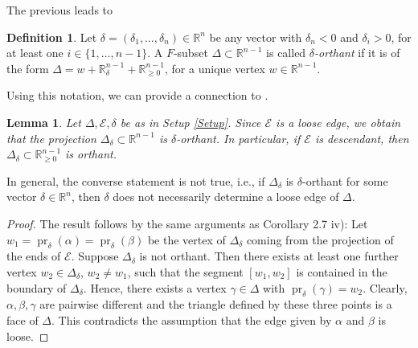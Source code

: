 \documentclass[11pt]{amsart}
\theoremstyle{plain}
\newtheorem{Lem}[Thm]{Lemma}
\theoremstyle{definition}
\newtheorem{Def}[Thm]{Definition}
\numberwithin{equation}{section}
\newcommand{\pr}{\operatorname{pr}}
\renewcommand{\a}{\alpha}
\renewcommand{\b}{\beta}
\newcommand{\g}{\gamma}
\renewcommand{\d}{\delta}
\newcommand{\D}{\Delta}
\newcommand{\RR}{\mathbb R}
\newcommand{\cE}{\mathcal{E}}
\newcommand{\gqz}{{\geq 0}}
\renewcommand{\(}{(\!(}
\renewcommand{\)}{)\!)}
\begin{document}
The previous leads to

\begin{Def}
	Let $ \d = (\d_1, \ldots , \d_n )\in \RR^{n} $ be {any} vector with $ \d_n < 0 $ and $ \d_i > 0 $, for at least one $ i \in \{ 1, \ldots, n- 1 \} $. 
	A $ F $-subset $ \D \subset \RR^{n-1} $ is called {\em $ \d $-orthant}
	if it is of the form
	$ \D = w + \RR^{n-1}_\d + \RR^{n-1}_\gqz $,
	for a unique vertex $ w \in \RR^{n-1} $.
\end{Def}

Using this notation, we can provide a connection to \cite{RS}.

\begin{Lem}
	\label{Lem:loose=>orthant}
	Let $ \D, \cE, \d $ be as in Setup \ref{Setup}.
	Since $ \cE $ is a loose edge, we obtain that the projection $ \D_\d  \subset \RR^{n-1} $ is $ \d $-orthant.
	In particular, if $ \cE $ is descendant, then $ \D_\d \subset \RR^{n-1}_\gqz $ is orthant.
\end{Lem}



In general, the converse statement is not true,
i.e., if $ \D_\d $ is $ \d $-orthant for some vector $ \d \in \RR^n$, 
then $ \d $ does not necessarily determine a loose edge of $ \D $.


\begin{proof}
	The result follows by the same arguments as \cite{RS} Corollary 2.7 iv):
	Let $ w_1 = \pr_\d (\a) = \pr_\d (\b) $ be the vertex of $  \D_\d $ coming from the projection of the ends of $ \cE $. 
	Suppose $ \D_\d $ is not orthant.
	Then there exists at least one further vertex $ w_2 \in \D_\d $, $ w_2 \neq w_1 $, such that the segment $ [w_1, w_2] $ is contained in the boundary of $ \D_\d $.
	Hence, there exists a vertex $ \g \in \D  $ with $ \pr_\d ( \g) = w_2 $.
	Clearly, $ \a, \b , \g $ are pairwise different and the triangle defined by these three points is a face of $ \D $. 
	This contradicts the assumption that the edge given by $ \a $ and $ \b $ is loose.
\end{proof}
 
\end{document}

